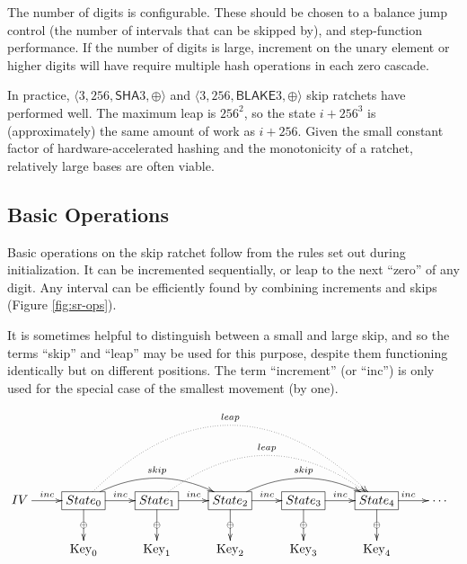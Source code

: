 \documentclass[twocolumn]{article}
\begin{document}
	The number of digits is configurable. These should be chosen to a balance jump control (the number of intervals that can be skipped by), and step-function performance. If the number of digits is large, increment on the unary element or higher digits will have require multiple hash operations in each zero cascade.
	
	In practice, $\langle 3, 256, \textsf{SHA}3, \oplus \rangle$ and $\langle 3, 256, \textsf{BLAKE}3, \oplus \rangle$ skip ratchets have performed well. The maximum leap is $256^{2}$, so the state $i + 256^{3}$ is (approximately) the same amount of work as $i + 256$. Given the small constant factor of hardware-accelerated hashing and the monotonicity of a ratchet, relatively large bases are often viable.

	\subsection{Basic Operations}
	
	Basic operations on the skip ratchet follow from the rules set out during initialization. It can be incremented sequentially, or leap to the next ``zero'' of any digit. Any interval can be efficiently found by combining increments and skips (Figure \ref{fig:sr-ops}).
	
	It is sometimes helpful to distinguish between a small and large skip, and so the terms ``skip'' and ``leap'' may be used for this purpose, despite them functioning identically but on different positions. The term ``increment'' (or ``inc'') is only used for the special case of the smallest movement (by one).
	
	\begin{figure*}[h]
		\centering
		
		$\xymatrix{
			IV \ar[r]^<<<<<{inc} 
				& *+[F]{State_{0}}
					\ar[d]|\oplus
					\ar[r]^{inc}
					\ar@/^1.5pc/[rr]^{skip}
					\ar@{.>}@/^5pc/[rrrr]^{leap}
				& *+[F]{State_{1}}
					\ar[d]|\oplus
					\ar[r]^{inc}
					\ar@{.>}@/^3pc/[rrr]^{leap}
				& *+[F]{State_{2}} 
					\ar[d]|\oplus
					\ar[r]^{inc}
					\ar@/^1.5pc/[rr]^{skip}
				& *+[F]{State_{3}}
					\ar[d]|\oplus
					\ar[r]^{inc}
				& *+[F]{State_{4}}
					\ar[d]|\oplus
					\ar[r]^{inc}
				& \cdots
			\\
				& \text{Key}_{0}
				& \text{Key}_{1}
				& \text{Key}_{2}
				& \text{Key}_{3}
				& \text{Key}_{4}
		}$
		
		\caption{Binary Skip Ratchet Operations}
		\label{fig:sr-ops}
	\end{figure*}
\end{document}
